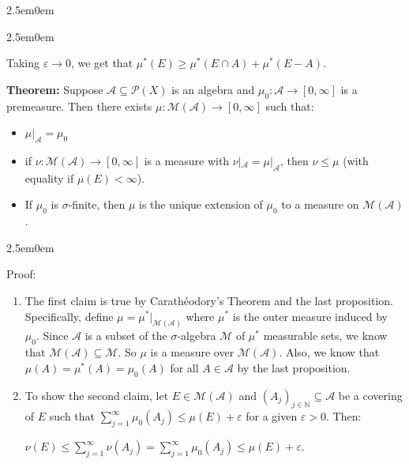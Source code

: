 \documentclass{book}
\newcommand{\hThree}{%
   \color{PineGreen!85!Orange}
   \fontsize{12}{14}\selectfont%
}
\newenvironment{myIndent}{%
   \begin{adjustwidth}{2.5em}{0em}%
}{%
   \end{adjustwidth}%
}
\newcommand{\blab}[1]{\textbf{#1}}
\newcommand{\retTwo}{\hfill\bigbreak}
\begin{document}
\begin{myIndent}
\begin{enumerate}
\begin{myIndent}
         Taking $\varepsilon \rightarrow 0$, we get that $\mu^*(E) \geq \mu^*(E \cap A) + \mu^*(E - A)$.\retTwo
      \end{myIndent}
   \end{enumerate}

   \blab{Theorem:} Suppose $\mathcal{A} \subseteq \mathcal{P}(X)$ is an algebra and $\mu_0: \mathcal{A} \longrightarrow [0, \infty]$ is a premeasure. Then there exists $\mu: \mathcal{M}(\mathcal{A}) \longrightarrow [0, \infty]$ such that:
   \begin{itemize}
      \item $\mu|_\mathcal{A} = \mu_0$
      \item if $\nu: \mathcal{M}(\mathcal{A}) \longrightarrow [0, \infty]$ is a measure with $\nu|_\mathcal{A} = \mu|_\mathcal{A}$, then $\nu \leq \mu$ (with equality if $\mu(E) < \infty$).
      \item If $\mu_0$ is $\sigma$-finite, then $\mu$ is the unique extension of $\mu_0$ to a measure on $\mathcal{M}(\mathcal{A})$.
   \end{itemize}

   
   \begin{myIndent}\hThree
      Proof:\\
      
      \begin{enumerate}
         \item The first claim is true by Carathéodory's Theorem and the last proposition.\\ Specifically, define $\mu = \mu^*|_{\mathcal{M}(\mathcal{A})}$ where $\mu^*$ is the outer measure induced by\\ $\mu_0$. Since $\mathcal{A}$ is a subset of the $\sigma$-algebra $\mathcal{M}$ of $\mu^*$ measurable sets, we know\\ that $\mathcal{M}(\mathcal{A}) \subseteq \mathcal{M}$. So $\mu$ is a measure over $\mathcal{M}(\mathcal{A})$. Also, we know that\\ $\mu(A) = \mu^*(A) = \mu_0(A)$ for all $A \in \mathcal{A}$ by the last proposition.\retTwo
   
         \item To show the second claim, let $E \in \mathcal{M}(\mathcal{A})$ and $(A_j)_{j \in \mathbb{N}} \subseteq \mathcal{A}$ be a covering of $E$ such that $\sum\limits_{j=1}^\infty \mu_0(A_j) \leq \mu(E) + \varepsilon$ for a given $\varepsilon > 0$. Then:
         
         {\centering$\nu(E) \leq \sum\limits_{j=1}^\infty \nu(A_j) = \sum\limits_{j=1}^\infty \mu_0(A_j) \leq  \mu(E) + \varepsilon$.\retTwo\par}
   

\end{enumerate}
\end{myIndent}
\end{myIndent}
\end{document}
